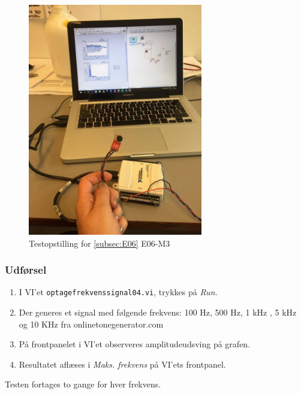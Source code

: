 		\begin{figure}[htb]
			\centering
			\includegraphics[width=3in]{webcamop.jpg}
			\caption{Testopstilling for \ref{subsec:E06} E06-M3}
			\label{fig:webop}
		\end{figure}
	
		\subsubsection{Udførsel}
			\begin{enumerate}
				\item I VI'et \texttt{optagefrekvenssignal04.vi}, trykkes på \textit{Run}.  
				\item Der generes et signal med følgende frekvens: 100 Hz, 500 Hz, 1 kHz , 5 kHz og 10 KHz fra onlinetonegenerator.com
				\item På frontpanelet i VI'et observeres amplitudeudsving på grafen.  
				\item Resultatet aflæses i \textit{Maks. frekvens} på VI'ets frontpanel.
			\end{enumerate}
			
			Testen fortages to gange for hver frekvens.  
		
